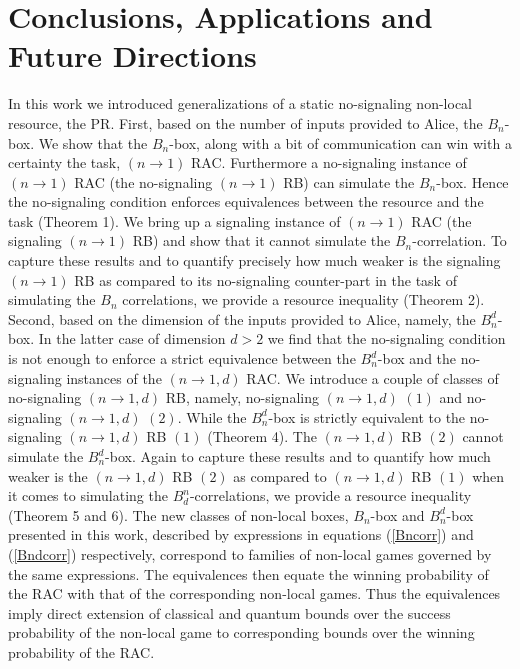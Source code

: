 \documentclass[%
 reprint,
 amsmath,amssymb,
 aps,
]{revtex4-1}
\begin{document}
\section{Conclusions, Applications and Future Directions}
In this work we introduced generalizations of a static no-signaling non-local resource, the PR. First, based on the number of inputs provided to Alice, the $B_n$-box. We show that the $B_n$-box, along with a bit of communication can win with a certainty the task, $(n\rightarrow 1)$ RAC. Furthermore a no-signaling instance of $(n\rightarrow 1)$ RAC (the no-signaling $(n\rightarrow 1)$  RB) can simulate the $B_n$-box. Hence the no-signaling condition enforces equivalences between the resource and the task (Theorem 1). We bring up a signaling instance of $(n\rightarrow 1)$ RAC (the signaling $(n\rightarrow 1)$  RB) and show that it cannot simulate the $B_n$-correlation. To capture these results and to quantify precisely how much weaker is the signaling $(n\rightarrow 1)$  RB as compared to its no-signaling counter-part in the task of simulating the $B_n$ correlations, we provide a resource inequality (Theorem 2).
Second, based on the dimension of the inputs provided to Alice, namely, the $B_n^d$-box. In the latter case of dimension $d>2$ we find that the no-signaling condition is not enough to enforce a strict equivalence between the $B_n^d$-box and the no-signaling instances of the $(n\rightarrow1,d)$ RAC. We introduce a couple of classes of no-signaling $(n\rightarrow1,d)$ RB, namely, no-signaling $(n\rightarrow1,d)$ $(1)$ and no-signaling $(n\rightarrow1,d)$ $(2)$. While the $B_n^d$-box is strictly equivalent to the no-signaling $(n\rightarrow1,d)$ RB $(1)$ (Theorem 4). The $(n\rightarrow1,d)$ RB $(2)$ cannot simulate the $B_n^d$-box. Again to capture these results and to quantify how much weaker is the $(n\rightarrow1,d)$ RB $(2)$ as compared to $(n\rightarrow1,d)$ RB $(1)$ when it comes to simulating the $B^n_d$-correlations, we provide a resource inequality (Theorem 5 and 6). The new classes of non-local boxes, $B_n$-box and $B_n^d$-box presented in this work, described by expressions in equations (\ref{Bncorr}) and (\ref{Bndcorr}) respectively, correspond to families of non-local games governed by the same expressions. The equivalences then equate the winning probability of the RAC with that of the corresponding non-local games. Thus the equivalences imply direct extension of classical and quantum bounds over the success probability of the non-local game to corresponding bounds over the winning probability of the RAC.\\
\end{document}
